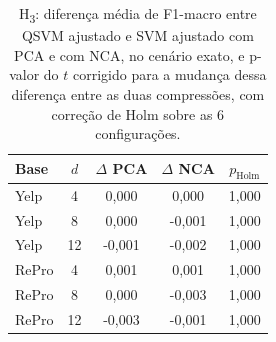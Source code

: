\begin{table}[t]
\centering
\caption{H\textsubscript{3}: diferença média de F1-macro entre QSVM ajustado e SVM ajustado com PCA e com NCA, no cenário exato, e p-valor do $t$ corrigido para a mudança dessa diferença entre as duas compressões, com correção de Holm sobre as 6 configurações.}
\label{tab:h3}
\footnotesize
\begin{tabular}{lcccc}
\toprule
Base & $d$ & $\Delta$ PCA & $\Delta$ NCA & $p_{\mathrm{Holm}}$ \\
\midrule
Yelp & 4 & 0,000 & 0,000 & 1,000 \\
Yelp & 8 & 0,000 & -0,001 & 1,000 \\
Yelp & 12 & -0,001 & -0,002 & 1,000 \\
RePro & 4 & 0,001 & 0,001 & 1,000 \\
RePro & 8 & 0,000 & -0,003 & 1,000 \\
RePro & 12 & -0,003 & -0,001 & 1,000 \\
\bottomrule
\end{tabular}
\end{table}